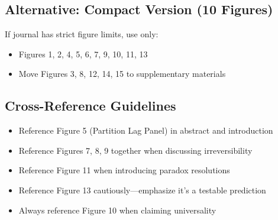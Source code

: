 \documentclass[11pt,letterpaper]{article}
\begin{document}
\subsection{Alternative: Compact Version (10 Figures)}

If journal has strict figure limits, use only:
\begin{itemize}
    \item Figures 1, 2, 4, 5, 6, 7, 9, 10, 11, 13
    \item Move Figures 3, 8, 12, 14, 15 to supplementary materials
\end{itemize}

\subsection{Cross-Reference Guidelines}

\begin{itemize}
    \item Reference Figure 5 (Partition Lag Panel) in abstract and introduction
    \item Reference Figures 7, 8, 9 together when discussing irreversibility
    \item Reference Figure 11 when introducing paradox resolutions
    \item Reference Figure 13 cautiously—emphasize it's a testable prediction
    \item Always reference Figure 10 when claiming universality
\end{itemize}
\end{document}
